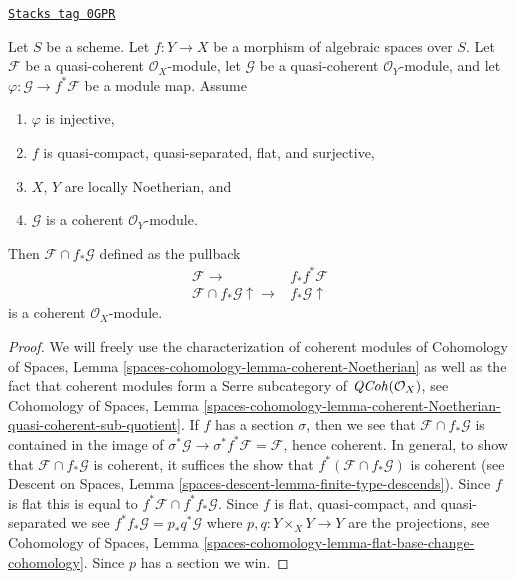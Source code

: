 \begin{lemma}
\label{spaces-groupoids-lemma-push-pull}
\href{https://stacks.math.columbia.edu/tag/0GPR}{\texttt{Stacks tag 0GPR}}

Let $S$ be a scheme.
Let $f : Y \to X$ be a morphism of algebraic spaces over $S$. Let $\mathcal{F}$
be a quasi-coherent $\mathcal{O}_X$-module, let $\mathcal{G}$
be a quasi-coherent $\mathcal{O}_Y$-module, and let
$\varphi : \mathcal{G} \to f^*\mathcal{F}$ be a module map. Assume
\begin{enumerate}
\item $\varphi$ is injective,
\item $f$ is quasi-compact, quasi-separated, flat, and surjective,
\item $X$, $Y$ are locally Noetherian, and
\item $\mathcal{G}$ is a coherent $\mathcal{O}_Y$-module.
\end{enumerate}
Then $\mathcal{F} \cap f_*\mathcal{G}$ defined as the pullback
$$
\begin{array}{cc}\mathcal{F} \longrightarrow & f_*f^*\mathcal{F} \\ \mathcal{F} \cap f_*\mathcal{G} \uparrow\longrightarrow & f_*\mathcal{G} \uparrow\end{array}
$$
is a coherent $\mathcal{O}_X$-module.
\end{lemma}

\begin{proof}
We will freely use the characterization of coherent modules of
Cohomology of Spaces, Lemma \ref{spaces-cohomology-lemma-coherent-Noetherian}
as well as the fact that coherent modules form a Serre subcategory
of $\mathit{QCoh}(\mathcal{O}_X)$, see
Cohomology of Spaces, Lemma
\ref{spaces-cohomology-lemma-coherent-Noetherian-quasi-coherent-sub-quotient}.
If $f$ has a section $\sigma$, then we see that
$\mathcal{F} \cap f_*\mathcal{G}$ is contained in the image of
$\sigma^*\mathcal{G} \to \sigma^*f^*\mathcal{F} = \mathcal{F}$,
hence coherent. In general, to show that $\mathcal{F} \cap f_*\mathcal{G}$
is coherent, it suffices the show that
$f^*(\mathcal{F} \cap f_*\mathcal{G})$ is coherent (see
Descent on Spaces, Lemma \ref{spaces-descent-lemma-finite-type-descends}).
Since $f$ is flat this is equal to $f^*\mathcal{F} \cap f^*f_*\mathcal{G}$.
Since $f$ is flat, quasi-compact, and quasi-separated we see
$f^*f_*\mathcal{G} = p_*q^*\mathcal{G}$ where $p, q : Y \times_X Y \to Y$
are the projections, see Cohomology of Spaces, Lemma
\ref{spaces-cohomology-lemma-flat-base-change-cohomology}.
Since $p$ has a section we win.
\end{proof}

